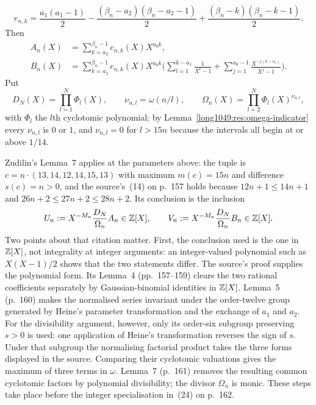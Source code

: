 \documentclass[11pt]{article}
\begin{document}
\[
 e_{n,k}=\frac{a_1(a_1-1)}2-\frac{(\beta_n-a_2)(\beta_n-a_2-1)}2
 +\frac{(\beta_n-k)(\beta_n-k-1)}2 .
\]
Then
\begin{align}
 A_n(X)&=\sum_{k=a_2}^{\beta_n-1}c_{n,k}(X)X^{a_0k},\label{long1049:eq:A-explicit}\\
 B_n(X)&=\sum_{k=a_2}^{\beta_n-1}c_{n,k}(X)X^{a_0k}
 \biggl(\sum_{l=1}^{k-a_1}\frac1{X^{l}-1}
 +\sum_{j=1}^{a_0-1}\frac{X^{-j(k-a_1)}}{X^{j}-1}\biggr).\label{long1049:eq:B-explicit}
\end{align}
Put
\begin{equation}\label{long1049:eq:cyclotomic-products}
 D_N(X)=\prod_{l=1}^{N}\Phi_l(X),\qquad
 \nu_{n,l}=\omega(n/l),\qquad
 \Omega_n(X)=\prod_{l=2}^{N}\Phi_l(X)^{\nu_{n,l}},
\end{equation}
with $\Phi_l$ the $l$th cyclotomic polynomial; by
Lemma~\ref{long1049:res:omega-indicator} every $\nu_{n,l}$ is $0$ or $1$, and
$\nu_{n,l}=0$ for $l>15n$ because the intervals all begin at or above $1/14$.

Zudilin's Lemma~7 \cite[p.~161, (23)]{zudilin2004} applies at the parameters above: the tuple is
$c=n\cdot(13,14,12,14,15,13)$ with maximum $m(c)=15n$ and difference $s(c)=n>0$,
and the source's~(14) on p.~157 holds because $12n+1\le14n+1$ and
$26n+2\le27n+2\le28n+2$.  Its conclusion is the inclusion
\begin{equation}\label{long1049:eq:integer-polynomial-pair}
 U_n:=X^{-M_n}\frac{D_N}{\Omega_n}A_n\in\Z[X],\qquad
 V_n:=X^{-M_n}\frac{D_N}{\Omega_n}B_n\in\Z[X].
\end{equation}
Two points about that citation matter.  First, the conclusion used is the one
in $\mathbb{Z}[X]$, not integrality at integer arguments: an integer-valued polynomial
such as $X(X-1)/2$ shows that the two statements differ.  The source's proof supplies the polynomial form. Its Lemma~4
(pp.~157--159) clears the two rational coefficients separately by
Gaussian-binomial identities in $\mathbb{Z}[X]$. Lemma~5 (p.~160) makes the
normalised series invariant under the order-twelve group generated by
Heine's parameter transformation and the exchange of $a_1$ and $a_2$.
For the divisibility argument, however, only its order-six subgroup
preserving $s>0$ is used: one application of Heine's transformation
reverses the sign of $s$. Under that subgroup the normalising factorial
product takes the three forms displayed in the source. Comparing their cyclotomic
valuations gives the maximum of three terms in $\omega$.
Lemma~7 (p.~161) removes the resulting common cyclotomic factors by
polynomial divisibility; the divisor $\Omega_n$ is monic. These steps
take place before the integer specialisation in~(24) on p.~162.
\end{document}
